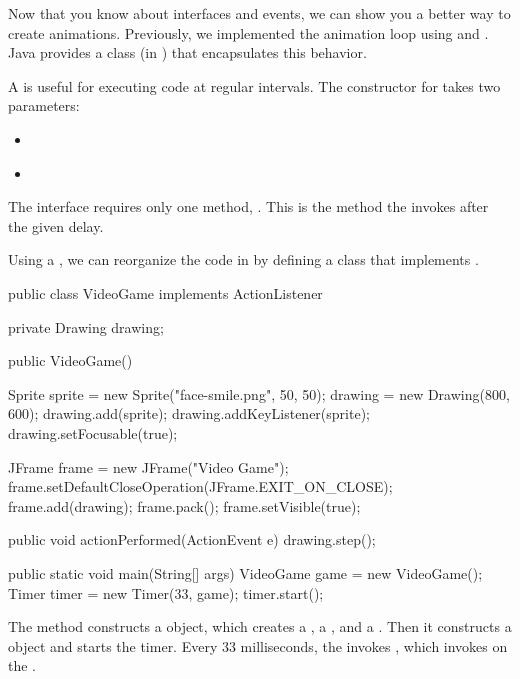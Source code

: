 
Now that you know about interfaces and events, we can show you a better way to create animations.
Previously, we implemented the animation loop using  and .
Java provides a  class (in ) that encapsulates this behavior.

A  is useful for executing code at regular intervals.
The constructor for  takes two parameters:

\begin{itemize}
\item {} {\tt ~~~~~~~~~~~~~~~} 

\item {} {\tt ~} 
\end{itemize}

The  interface requires only one method, .
This is the method the  invokes after the given delay.

Using a , we can reorganize the code in  by defining a class that implements .

\begin{code}
public class VideoGame implements ActionListener {
    private Drawing drawing;

    public VideoGame() {
        Sprite sprite = new Sprite("face-smile.png", 50, 50);
        drawing = new Drawing(800, 600);
        drawing.add(sprite);
        drawing.addKeyListener(sprite);
        drawing.setFocusable(true);

        JFrame frame = new JFrame("Video Game");
        frame.setDefaultCloseOperation(JFrame.EXIT_ON_CLOSE);
        frame.add(drawing);
        frame.pack();
        frame.setVisible(true);
    }

    public void actionPerformed(ActionEvent e) {
        drawing.step();
    }

    public static void main(String[] args) {
        VideoGame game = new VideoGame();
        Timer timer = new Timer(33, game);
        timer.start();
    }
}
\end{code}

The  method constructs a  object, which creates a , a , and a .
Then it constructs a  object and starts the timer.
Every 33 milliseconds, the  invokes , which invokes  on the .

